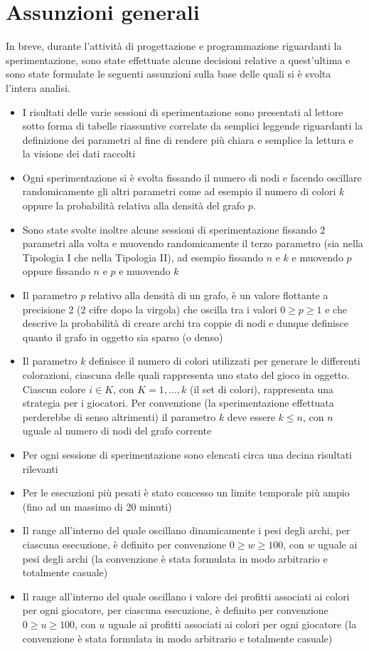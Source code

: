 \section{Assunzioni generali}
\justify
In breve, durante l'attività di progettazione e programmazione riguardanti la sperimentazione, sono state effettuate alcune decisioni relative a quest'ultima e sono state formulate le seguenti assunzioni sulla base delle quali si è svolta l'intera analisi.

\begin{itemize}
	\item I risultati delle varie sessioni di sperimentazione sono presentati al lettore sotto forma di tabelle riassuntive correlate da semplici leggende riguardanti la definizione dei parametri al fine di rendere più chiara e semplice la lettura e la visione dei dati raccolti
	\item Ogni sperimentazione si è svolta fissando il numero di nodi e facendo oscillare randomicamente gli altri parametri come ad esempio il numero di colori $k$ oppure la probabilità relativa alla densità del grafo $p$.
	\item Sono state svolte inoltre alcune sessioni di sperimentazione fissando 2 parametri alla volta e muovendo randomicamente il terzo parametro (sia nella Tipologia I che nella Tipologia II), ad esempio fissando $n$ e $k$ e muovendo $p$ oppure fissando $n$ e $p$ e muovendo $k$
	\item Il parametro $p$ relativo alla densità di un grafo, è un valore flottante a precisione 2 (2 cifre dopo la virgola) che oscilla tra i valori \(0 \geq p \geq 1\) e che descrive la probabilità di creare archi tra coppie di nodi e dunque definisce quanto il grafo in oggetto sia sparso (o denso)
	\item Il parametro $k$ definisce il numero di colori utilizzati per generare le differenti colorazioni, ciascuna delle quali rappresenta uno stato del gioco in oggetto. Ciascun colore \(i \in K\), con \(K = 1,\ldots,k\) (il set di colori), rappresenta una strategia per i giocatori. Per convenzione (la sperimentazione effettuata perderebbe di senso altrimenti) il parametro $k$ deve essere \(k \leq n\), con $n$ uguale al numero di nodi del grafo corrente
	\item Per ogni sessione di sperimentazione sono elencati circa una decina risultati rilevanti 
	\item Per le esecuzioni più pesati è stato concesso un limite temporale più ampio (fino ad un massimo di 20 minuti)
	\item Il range all'interno del quale oscillano dinamicamente i pesi degli archi, per ciascuna esecuzione, è definito per convenzione \(0 \geq w \geq 100\), con $w$ uguale ai pesi degli archi (la convenzione è stata formulata in modo arbitrario e totalmente casuale)
	\item Il range all'interno del quale oscillano i valore dei profitti associati ai colori per ogni giocatore, per ciascuna esecuzione, è definito per convenzione \(0 \geq u \geq 100\), con $u$ uguale ai profitti associati ai colori per ogni giocatore (la convenzione è stata formulata in modo arbitrario e totalmente casuale)
\end{itemize}


